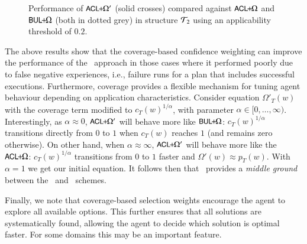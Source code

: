 \begin{figure}[t]
   \centering
   
   \caption{Performance of $\mbox{$\textsf{\small ACL}\!\!+\!\!\Omega'$}$ (solid crosses) compared against $\mbox{$\textsf{\small ACL}\!\!+\!\!\Omega$}$ and $\mbox{$\textsf{\small BUL}\!\!+\!\!\Omega$}$ (both in dotted grey) in structure ${\mathcal{T}}_2$ using an applicability threshold of $0.2$.}
   \label{fig:performance-applicability}
\end{figure}


The above results show that the coverage-based confidence weighting can improve
the performance of the \CL\ approach in those cases where it performed poorly due
to false negative experiences, i.e., failure runs for a plan that includes
successful executions.
Furthermore, coverage provides a flexible mechanism for tuning agent behaviour
depending on application characteristics. Consider equation $\Omega'_T(w)$ with
the coverage term modified to $c_T(w)^{1/\alpha}$, with parameter $\alpha \in
[0,\ldots,\infty)$.
Interestingly, as $\alpha \approx 0$, $\mbox{$\textsf{\small ACL}\!\!+\!\!\Omega'$}$ will behave more like $\mbox{$\textsf{\small BUL}\!\!+\!\!\Omega$}$:
$c_T(w)^{1/\alpha}$ transitions directly from $0$ to $1$ when $c_T(w)$ reaches
$1$ (and remains zero otherwise).
On other hand, when $\alpha \approx \infty$, $\mbox{$\textsf{\small ACL}\!\!+\!\!\Omega'$}$ will behave more like the
$\mbox{$\textsf{\small ACL}\!\!+\!\!\Omega$}$: $c_T(w)^{1/\alpha}$ transitions from $0$ to $1$ faster and $\Omega'(w)
\approx p_T(w)$. With $\alpha=1$ we get our initial equation.
It follows then that \CLSELB\ provides a \emph{middle ground} between
the \CLSELA\ and \BULSELA\ schemes.


Finally, we note that coverage-based selection weights encourage the agent to
explore all available options. This further ensures that all solutions are
systematically found, allowing the agent to decide which solution is optimal
faster. For some domains this may be an important feature.

